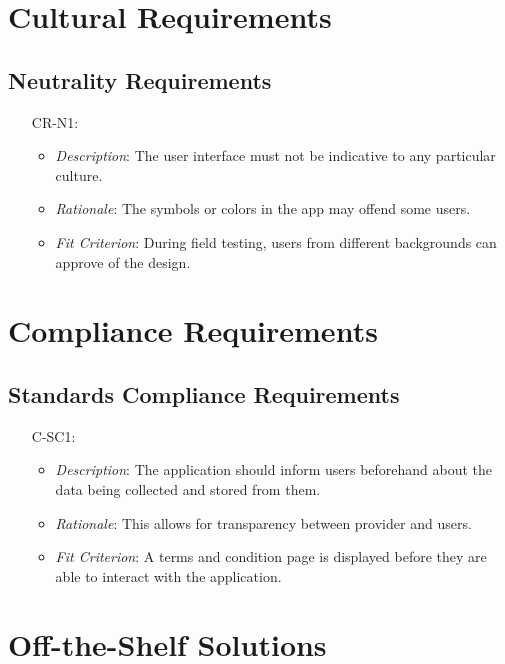 \documentclass[12pt]{article}
\begin{document}
\section{Cultural Requirements}
\subsection{Neutrality Requirements}
\noindent \begin{itemize}
    \item[CR-N1:] 
        \begin{itemize}
            \item \textit{Description}: The user interface must not be indicative to any particular culture.
            \item \textit{Rationale}: The symbols or colors in the app may offend some users.
            \item \textit{Fit Criterion}: During field testing, users from different backgrounds can approve of the design.
        \end{itemize}
\end{itemize}

\section{Compliance Requirements}

\subsection{Standards Compliance Requirements}
\noindent \begin{itemize}
    \item[C-SC1:] 
        \begin{itemize}
            \item \textit{Description}: The application should inform users beforehand about the data being collected and stored from them.
            \item \textit{Rationale}: This allows for transparency between provider and users.
            \item \textit{Fit Criterion}: A terms and condition page is displayed before they are able to interact with the application.
        \end{itemize}
\end{itemize}


\section{Off-the-Shelf Solutions}
\end{document}
